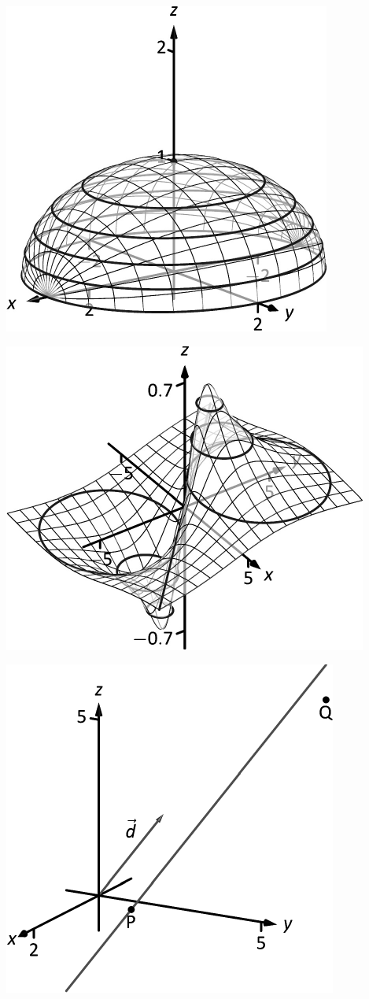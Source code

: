 \documentclass[10pt]{article}
\begin{document}
\includegraphics{figlevelcurve1_3DBW.pdf}
\texttt{}

\includegraphics{figlevelcurve2_3DBW.pdf}
\texttt{}

\includegraphics{figlines1_3DBW.pdf}
\texttt{}
\end{document}
